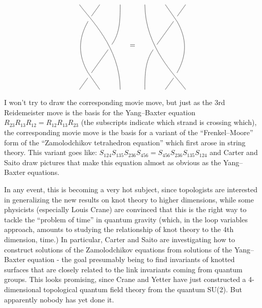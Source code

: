 \[
\begin{tikzpicture}
    \node[coordinate] (a0) at (0,0) {};
    \node[coordinate] (b0) at (1,0) {};
    \node[coordinate] (c0) at (2,0) {};
    \node (ab1) at (0.5,-0.7) {};
    \node (c1)  at (2,-0.7)   {};
    \node (c2)  at (2,-1.4)   {};
    \node (bc3) at (1.5,-2.1) {};
    \node (c3)  at (2,-2.1)   {};
    \node (ab5) at (0.5,-3.5) {};
    \node[coordinate] (a6) at (0,-4.2) {};
    \node[coordinate] (b6) at (1,-4.2) {};
    \node[coordinate] (c6) at (2,-4.2) {};
    
    \draw (a0) .. controls (ab1) and (c3) .. (c6);
    \draw (b0) to (ab1) to [bend right] (ab5) to (b6);
    \draw (c0) .. controls (c1) and (c2) .. (bc3)
          (bc3) to (ab5) (ab5) to (a6);
\end{tikzpicture}
\quad \raisebox{2.1cm}{=} \quad
\begin{tikzpicture}
    \node (bc1) at (1.5,-0.7) {};
    \node (a3)  at (0,-2.1)   {};
    \node (ab3) at (0.5,-2.1) {};
    \node (a4)  at (0,-2.8)   {};
    \node (a5)  at (0,-3.5)   {};
    \node (bc5) at (1.5,-3.5) {};
    
    \draw (c6) .. controls (bc5) and (a3) .. (a0);
    \draw (b6) to (bc5) to [bend right] (bc1) to (b0);
    \draw (a6) .. controls (a5) and (a4) .. (ab3)
          (ab3) to (bc1) (bc1) to (c0);
\end{tikzpicture}
\]

I won't try to draw the corresponding movie move, but just as the 3rd Reidemeister move is the basis for the Yang--Baxter equation $R_{23}R_{13}R_{12} = R_{12}R_{13}R_{23}$ (the subscripts indicate which strand is crossing which), the corresponding movie move is the basis for a variant of the ``Frenkel--Moore'' form of the ``Zamolodchikov tetrahedron equation'' which first arose in string theory. This variant goes like: $S_{124}S_{135}S_{236}S_{456} = S_{456}S_{236}S_{135}S_{124}$ and Carter and Saito draw pictures that make this equation almost as obvious as the Yang--Baxter equations.

In any event, this is becoming a very hot subject, since topologists are interested in generalizing the new results on knot theory to higher dimensions, while some physicists (especially Louis Crane) are convinced that this is the right way to tackle the ``problem of time'' in quantum gravity (which, in the loop variables approach, amounts to studying the relationship of knot theory to the 4th dimension, time.) In particular, Carter and Saito are investigating how to construct solutions of the Zamolodchikov equations from solutions of the Yang--Baxter equation - the goal presumably being to find invariants of knotted surfaces that are closely related to the link invariants coming from quantum groups. This looks promising, since Crane and Yetter have just constructed a 4-dimensional topological quantum field theory from the quantum SU(2). But apparently nobody has yet done it.

